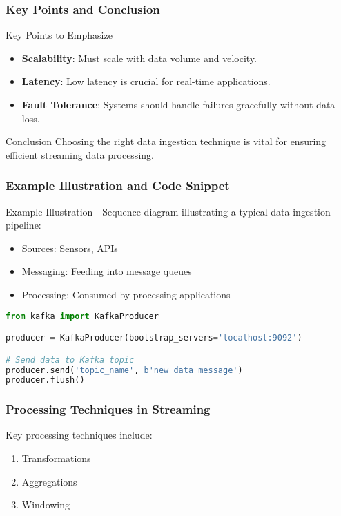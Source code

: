 \documentclass[aspectratio=169]{beamer}
\begin{document}
\begin{frame}[fragile]
    \frametitle{Key Points and Conclusion}
    \begin{block}{Key Points to Emphasize}
        \begin{itemize}
            \item \textbf{Scalability}: Must scale with data volume and velocity.
            \item \textbf{Latency}: Low latency is crucial for real-time applications.
            \item \textbf{Fault Tolerance}: Systems should handle failures gracefully without data loss.
        \end{itemize}
    \end{block}
    \begin{block}{Conclusion}
        Choosing the right data ingestion technique is vital for ensuring efficient streaming data processing.
    \end{block}
\end{frame}

\begin{frame}[fragile]
    \frametitle{Example Illustration and Code Snippet}
    \begin{block}{Example Illustration}
        - Sequence diagram illustrating a typical data ingestion pipeline:
        \begin{itemize}
            \item Sources: Sensors, APIs
            \item Messaging: Feeding into message queues
            \item Processing: Consumed by processing applications
        \end{itemize}
    \end{block}
    \begin{lstlisting}[language=Python]
from kafka import KafkaProducer

producer = KafkaProducer(bootstrap_servers='localhost:9092')

# Send data to Kafka topic
producer.send('topic_name', b'new data message')
producer.flush()
    \end{lstlisting}
\end{frame}

\begin{frame}[fragile]
    \frametitle{Processing Techniques in Streaming}
    Key processing techniques include:
    \begin{enumerate}
        \item Transformations
        \item Aggregations
        \item Windowing
    \end{enumerate}
\end{frame}
\end{document}
